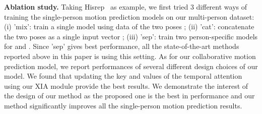 \noindent\textbf{Ablation study.} 
Taking Hisrep~\cite{mao2020history} as example, we first tried 3 different ways of training the single-person motion prediction models on our multi-person dataset: (i) 'mix': train a single model using data of the two poses ; (ii) 'cat': concatenate the two poses as a single input vector ; (iii) 'sep': train two person-specific models for  and . Since 'sep' gives best performance, all the state-of-the-art methods reported above in this paper is using this setting.
As for our collaborative motion prediction model, we report performances of several different design choices of our model. We found that updating the key and values of the temporal attention using our XIA module provide the best results.
We demonstrate the interest of the design of our method as the proposed one is the best in performance and our method significantly improves all the single-person motion prediction results.